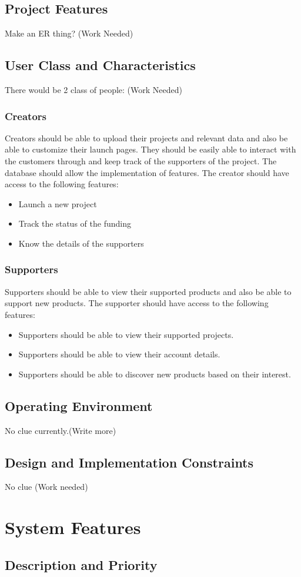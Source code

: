 \documentclass{report}[12pt]
\begin{document}
\section{Project Features}
Make an ER thing? (Work Needed)

\section{User Class and Characteristics}
There would be 2 class of people:  (Work Needed)
\subsection{Creators}
Creators should be able to upload their projects and relevant data and also be able to customize their launch pages. They should be easily able to interact with the customers through and keep track of the supporters of the project. The database should allow the implementation of features. The creator should have access to the following features: 
\begin{itemize}
    \item Launch a new project
    \item Track the status of the funding
    \item Know the details of the supporters
\end{itemize}
\subsection{Supporters}
Supporters should be able to view their supported products and also be able to support new products. The supporter should have access to the following features:
\begin{itemize}
    \item Supporters should be able to view their supported projects.
    \item Supporters should be able to view their account details. 
    \item Supporters should be able to discover new products based on their interest. 
\end{itemize}

\section{Operating Environment}
No clue currently.(Write more)

\section{Design and Implementation Constraints}
No clue (Work needed)

\chapter{System Features}
\section{Description and Priority}
\end{document}
